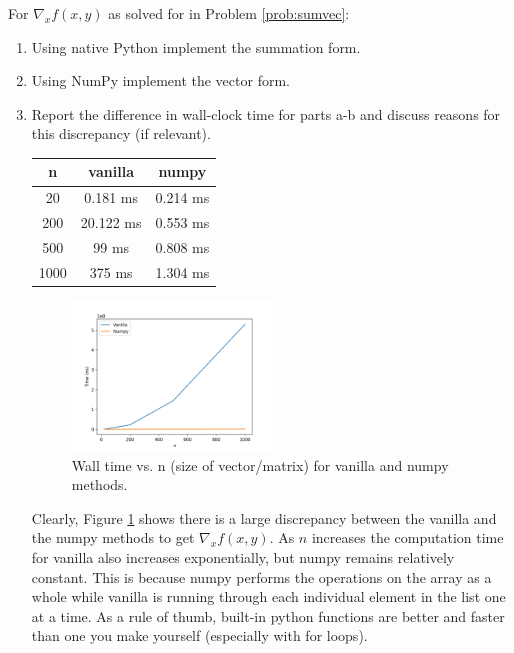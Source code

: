 \documentclass{article}
\begin{document}
\begin{aprob} \label{prob:sumvecimp}
    For $\nabla_x f(x,y)$ as solved for in Problem \ref{prob:sumvec}:
    \begin{enumerate}
        \item {} Using native Python implement the summation form.
        \item {} Using NumPy implement the vector form.
        \item {} Report the difference in wall-clock time for parts a-b and discuss reasons for this discrepancy (if relevant).
        \\
        \begin{center}
            \begin{tabular}{|c|c|c|}
                \hline
                n & vanilla & numpy \\
                \hline
                20 &  0.181 ms &0.214 ms \\
                200 & 20.122 ms & 0.553 ms \\
                500 & 99 ms & 0.808 ms \\
                1000 & 375 ms & 1.304 ms \\
                \hline
            \end{tabular}
        \end{center}
        \begin{figure}[h]
            \centering
            \includegraphics[width=0.5\textwidth]{Figure_1.png}
            \caption{Wall time vs. n (size of vector/matrix) for vanilla and numpy methods.}\label{fig:walltime}
        \end{figure}
        Clearly, Figure \ref{fig:walltime} shows there is a large discrepancy between the vanilla and the numpy methods to get $\nabla_x f(x,y)$. As $n$ increases the computation time for vanilla also increases exponentially, but numpy remains relatively constant.
        This is because numpy performs the operations on the array as a whole while vanilla is running through each individual element in the list one at a time. As a rule of thumb, built-in python functions are better and faster than one you make yourself (especially with for loops).
    \end{enumerate}


\end{aprob}
\end{document}
